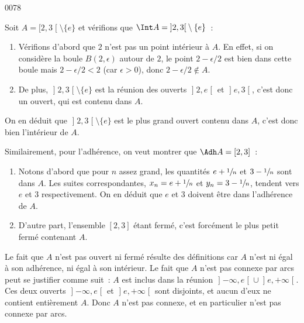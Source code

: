 
\begin{corrige}{0078}



Soit $A = \mathopen[2,3\mathclose[\setminus\{e\}$ et vérifions que
$\Int A = \mathopen]2,3\mathclose[\setminus\{e\}$~:
\begin{enumerate}
\item Vérifions d'abord que $2$ n'est pas un point intérieur à $A$. En
  effet, si on considère la boule $B(2,\epsilon)$ autour de $2$, le
  point $2 - \epsilon/2$ est bien dans cette boule mais $2 -
  \epsilon/2 < 2$ (car $\epsilon > 0$), donc $2 - \epsilon/2 \notin
  A$.

\item De plus, $\mathopen]2,3\mathclose[\setminus\{e\}$ est la réunion
  des ouverts $\mathopen]2,e\mathclose[$ et
  $\mathopen]e,3\mathclose[$, c'est donc un ouvert, qui est contenu
  dans $A$.
\end{enumerate}

On en déduit que $\mathopen]2,3\mathclose[\setminus\{e\}$ est le plus
grand ouvert contenu dans $A$, c'est donc bien l'intérieur de $A$.

Similairement, pour l'adhérence, on veut montrer que $\Adh A =
[2,3]$~:
\begin{enumerate}
\item Notons d'abord que pour $n$ assez grand, les quantités $e +
  \sfrac1n$ et $3 - \sfrac1n$ sont dans $A$. Les suites
  correspondantes, $x_n = e + \sfrac1n$ et $y_n = 3- \sfrac1n$,
  tendent vers $e$ et $3$ respectivement. On en déduit que $e$ et $3$
  doivent être dans l'adhérence de $A$.

\item D'autre part, l'ensemble $[2,3]$ étant fermé, c'est forcément le
  plus petit fermé contenant $A$.
\end{enumerate}

Le fait que $A$ n'est pas ouvert ni fermé résulte des définitions car
$A$ n'est ni égal à son adhérence, ni égal à son intérieur. Le fait
que $A$ n'est pas connexe par arcs peut se justifier comme suit~: $A$
est inclus dans la réunion $\mathopen]-\infty,e\mathclose[ \cup
\mathopen ]e,+\infty\mathclose[$. Ces deux ouverts
$\mathopen]-\infty,e\mathclose[$ et $\mathopen ]e,+\infty\mathclose[$
sont disjoints, et aucun d'eux ne contient entièrement $A$. Donc $A$
n'est pas connexe, et en particulier n'est pas connexe par arcs.


\end{corrige}
